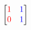 \documentclass[preview]{standalone}
\begin{document}
\begin{align*}
\begin{bmatrix} {\color{red}1} & {\color{blue}1} \\ {\color{red}0} & {\color{blue}1} \end{bmatrix}
\end{align*}
\end{document}
